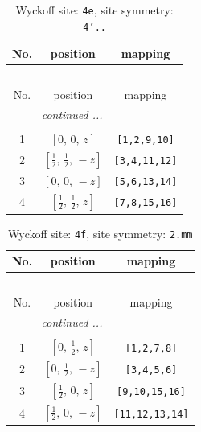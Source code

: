 \documentclass[fleqn,8pt]{jsarticle}
\begin{document}
\begin{longtable}{ccc}
\caption{Wyckoff site: {\tt 4e}, site symmetry: {\tt 4'..}}
 \\
 \hline \hline
No. & position & mapping \\ \hline \endfirsthead

\multicolumn{2}{l}{\tablename\ \thetable{}} \\
 \hline \hline
No. & position & mapping \\ \hline \endhead

 \hline \hline
\multicolumn{2}{r}{\footnotesize\it continued ...} \\ \endfoot

 \hline \hline
\multicolumn{2}{r}{} \\ \endlastfoot

1 & $\left[ 0,\, 0,\, z \right]$ & {\tt [1,2,9,10]} \\ \hline
2 & $\left[ \frac{1}{2},\, \frac{1}{2},\, - z \right]$ & {\tt [3,4,11,12]} \\ \hline
3 & $\left[ 0,\, 0,\, - z \right]$ & {\tt [5,6,13,14]} \\ \hline
4 & $\left[ \frac{1}{2},\, \frac{1}{2},\, z \right]$ & {\tt [7,8,15,16]} \\
\end{longtable}
\renewcommand{\arraystretch}{1.2}
\begin{longtable}{ccc}
\caption{Wyckoff site: {\tt 4f}, site symmetry: {\tt 2.mm}}
 \\
 \hline \hline
No. & position & mapping \\ \hline \endfirsthead

\multicolumn{2}{l}{\tablename\ \thetable{}} \\
 \hline \hline
No. & position & mapping \\ \hline \endhead

 \hline \hline
\multicolumn{2}{r}{\footnotesize\it continued ...} \\ \endfoot

 \hline \hline
\multicolumn{2}{r}{} \\ \endlastfoot

1 & $\left[ 0,\, \frac{1}{2},\, z \right]$ & {\tt [1,2,7,8]} \\ \hline
2 & $\left[ 0,\, \frac{1}{2},\, - z \right]$ & {\tt [3,4,5,6]} \\ \hline
3 & $\left[ \frac{1}{2},\, 0,\, z \right]$ & {\tt [9,10,15,16]} \\ \hline
4 & $\left[ \frac{1}{2},\, 0,\, - z \right]$ & {\tt [11,12,13,14]} \\
\end{longtable}
\end{document}
